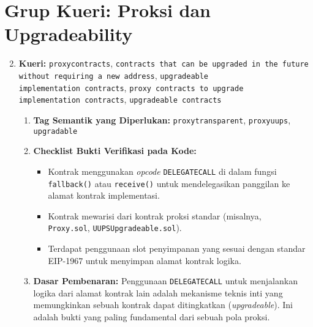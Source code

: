 \section{Grup Kueri: Proksi dan Upgradeability}
\begin{enumerate}
    \setcounter{enumi}{1}
    \item \textbf{Kueri:} \texttt{proxy\textunderscore contracts}, \texttt{contracts that can be upgraded in the future without requiring a new address}, \texttt{upgradeable \\implementation contracts}, \texttt{proxy contracts to upgrade \\implementation contracts}, \texttt{upgradeable contracts}
    \begin{enumerate}
        \item \textbf{Tag Semantik yang Diperlukan:} \texttt{proxy\textunderscore transparent}, \texttt{proxy\textunderscore uups}, \texttt{upgradable}
        \item \textbf{Checklist Bukti Verifikasi pada Kode:}
        \begin{itemize}
            \item Kontrak menggunakan \textit{opcode} \texttt{DELEGATECALL} di dalam fungsi \texttt{fallback()} atau \texttt{receive()} untuk mendelegasikan panggilan ke alamat kontrak implementasi.
            \item Kontrak mewarisi dari kontrak proksi standar (misalnya, \\\texttt{Proxy.sol}, \texttt{UUPSUpgradeable.sol}).
            \item Terdapat penggunaan slot penyimpanan yang sesuai dengan standar EIP-1967 untuk menyimpan alamat kontrak logika.
        \end{itemize}
        \item \textbf{Dasar Pembenaran:} Penggunaan \texttt{DELEGATECALL} untuk menjalankan logika dari alamat kontrak lain adalah mekanisme teknis inti yang memungkinkan sebuah kontrak dapat ditingkatkan (\textit{upgradeable}). Ini adalah bukti yang paling fundamental dari sebuah pola proksi.
    \end{enumerate}
\end{enumerate}


